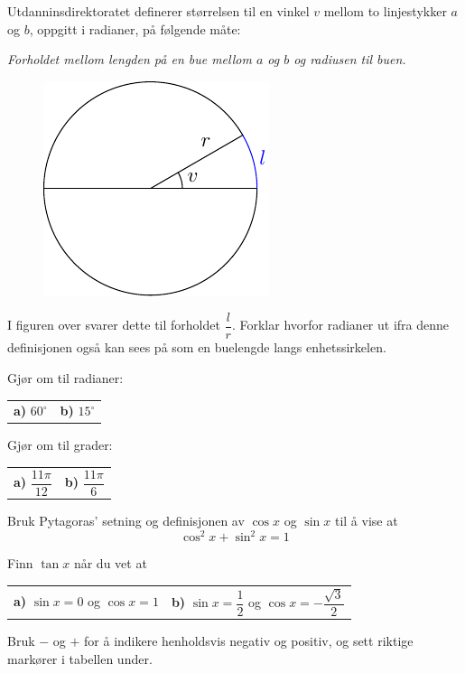 




\opgt
\setcounter{section}{1}	
Utdanninsdirektoratet definerer størrelsen til en vinkel $ v $ mellom to linjestykker $ a $ og $ b $, oppgitt i radianer,  på følgende måte:\os

\textsl{Forholdet mellom lengden på en bue mellom $ a $ og $ b $ og radiusen til buen.}
\begin{figure}
	\centering
	\includegraphics[]{../../fig/rad}
\end{figure}
I figuren over svarer dette til forholdet $ \dfrac{l}{r} $.
\os
Forklar hvorfor radianer ut ifra denne definisjonen også kan sees på som en buelengde langs enhetssirkelen.

Gjør om til radianer:\os
\begin{tabular}{@{}l l}
	\textbf{a)} $ 60^\circ $ & \quad \textbf{b)} $ 15^\circ $
\end{tabular}

Gjør om til grader:\os

\begin{tabular}{@{}l l}
	\textbf{a)} $ \dfrac{11\pi}{12} $ & \quad \textbf{b)} $ \dfrac{11\pi}{6} $
\end{tabular}

\nes
{}
Bruk Pytagoras' setning og definisjonen av $ \cos x $ og $ \sin x $ til å vise at
\[ \cos^2 x + \sin^2 x = 1 \] 

Finn $\tan x $ når du vet at\\
\begin{tabular}{@{}l l}
	\textbf{a)} $ \sin x = 0$ og $ \cos x=1 $ & \quad \textbf{b)} $ \sin x = \dfrac{1}{2} $ og $ \cos x = -\dfrac{\sqrt{3}}{2} $
\end{tabular}
\newpage
{}
Bruk $ - $ og $ + $ for å indikere henholdsvis negativ og positiv, og sett riktige markører i tabellen under.\os

